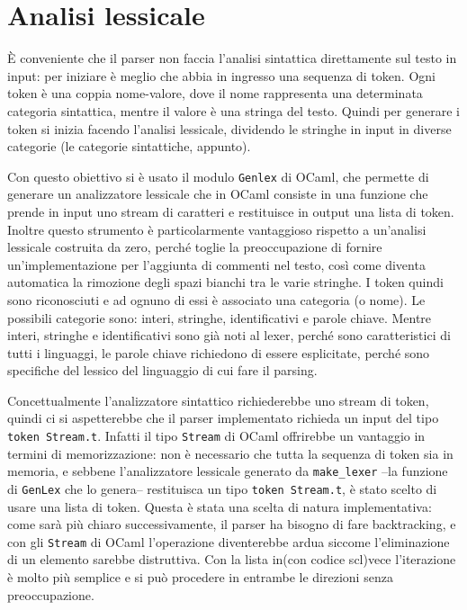 \documentclass[12pt,a4paper]{report}
\begin{document}
\hypertarget{analisi-lessicale}{%
\section{Analisi lessicale}\label{analisi-lessicale}}

È conveniente che il parser non faccia l'analisi sintattica direttamente
sul testo in input: per iniziare è meglio che abbia in ingresso una
sequenza di token. Ogni token è una coppia nome-valore, dove il nome
rappresenta una determinata categoria sintattica, mentre il valore è una
stringa del testo. Quindi per generare i token si inizia facendo
l'analisi lessicale, dividendo le stringhe in input in diverse categorie
(le categorie sintattiche, appunto).

Con questo obiettivo si è usato il modulo \texttt{Genlex} di OCaml, che
permette di generare un analizzatore lessicale che in OCaml consiste in
una funzione che prende in input uno stream di caratteri e restituisce
in output una lista di token. Inoltre questo strumento è particolarmente
vantaggioso rispetto a un'analisi lessicale costruita da zero, perché
toglie la preoccupazione di fornire un'implementazione per l'aggiunta di
commenti nel testo, così come diventa automatica la rimozione degli
spazi bianchi tra le varie stringhe. I token quindi sono riconosciuti e
ad ognuno di essi è associato una categoria (o nome). Le possibili
categorie sono: interi, stringhe, identificativi e parole chiave. Mentre
interi, stringhe e identificativi sono già noti al lexer, perché sono
caratteristici di tutti i linguaggi, le parole chiave richiedono di
essere esplicitate, perché sono specifiche del lessico del linguaggio di
cui fare il parsing.

Concettualmente l'analizzatore sintattico richiederebbe uno stream di
token, quindi ci si aspetterebbe che il parser implementato richieda un
input del tipo \texttt{token\ Stream.t}. Infatti il tipo \texttt{Stream}
di OCaml offrirebbe un vantaggio in termini di memorizzazione: non è
necessario che tutta la sequenza di token sia in memoria, e sebbene
l'analizzatore lessicale generato da \texttt{make\_lexer} --la funzione
di \texttt{GenLex} che lo genera-- restituisca un tipo
\texttt{token\ Stream.t}, è stato scelto di usare una lista di token.
Questa è stata una scelta di natura implementativa: come sarà più chiaro
successivamente, il parser ha bisogno di fare backtracking, e con gli
\texttt{Stream} di OCaml l'operazione diventerebbe ardua siccome
l'eliminazione di un elemento sarebbe distruttiva. Con la lista in(con
codice scl)vece l'iterazione è molto più semplice e si può procedere in
entrambe le direzioni senza preoccupazione.
\end{document}
